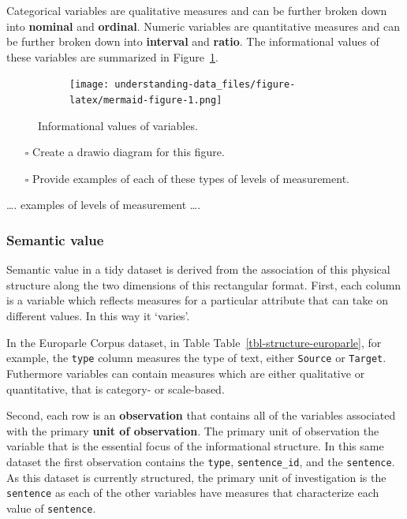 \documentclass[
  letterpaper,
]{latex/krantz}
\begin{document}
Categorical variables are qualitative measures and can be further broken
down into \textbf{nominal} and \textbf{ordinal}. Numeric variables are
quantitative measures and can be further broken down into
\textbf{interval} and \textbf{ratio}. The informational values of these
variables are summarized in Figure~\ref{fig-ud-informational-values}.

\begin{figure}

{\centering 

\begin{figure}[H]

{\centering \texttt{[image: understanding-data\_files/figure-latex/mermaid-figure-1.png]}

}

\end{figure}

}

\caption{\label{fig-ud-informational-values}Informational values of
variables.}

\end{figure}

\begin{itemize}
\item[$\square$]
  Create a drawio diagram for this figure.
\item[$\square$]
  Provide examples of each of these types of levels of measurement.
\end{itemize}

\ldots. examples of levels of measurement \ldots.

\hypertarget{ud-semantic-value}{%
\subsubsection{Semantic value}\label{ud-semantic-value}}

Semantic value in a tidy dataset is derived from the association of this
physical structure along the two dimensions of this rectangular format.
First, each column is a variable which reflects measures for a
particular attribute that can take on different values. In this way it
`varies'.

In the Europarle Corpus dataset, in Table
Table~\ref{tbl-structure-europarle}, for example, the \texttt{type}
column measures the type of text, either \texttt{Source} or
\texttt{Target}. Futhermore variables can contain measures which are
either qualitative or quantitative, that is category- or scale-based.

Second, each row is an \textbf{observation} that contains all of the
variables associated with the primary \textbf{unit of observation}. The
primary unit of observation the variable that is the essential focus of
the informational structure. In this same dataset the first observation
contains the \texttt{type}, \texttt{sentence\_id}, and the
\texttt{sentence}. As this dataset is currently structured, the primary
unit of investigation is the \texttt{sentence} as each of the other
variables have measures that characterize each value of
\texttt{sentence}.
\end{document}
